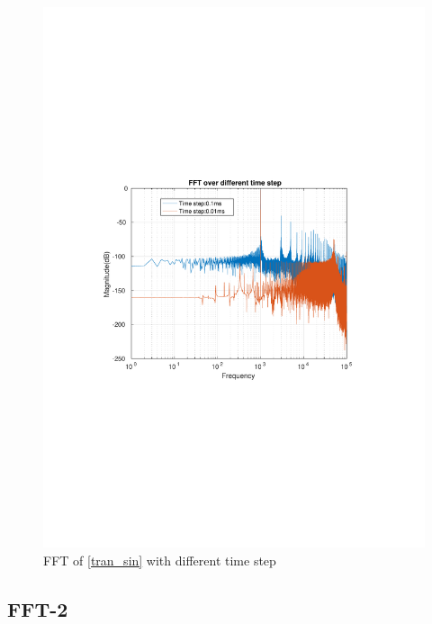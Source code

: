 \documentclass[12pt,a4paper,UKenglish]{article}
\begin{document}
\begin{figure} [htbp]
  \centering 
  \includegraphics[width=\textwidth]{img/2a.pdf} 
  \caption{FFT of \ref{tran_sin} with different time step}
  \label{fft_sin} 
\end{figure}
\subsection{FFT-2}
\end{document}
